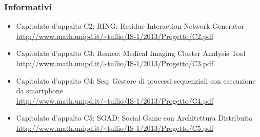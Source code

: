 	\subsubsection{Informativi}
	\begin{itemize}
		\item Capitolato d’appalto C2: RING: Residue Interaction Network Generator\\
			\url{http://www.math.unipd.it/~tullio/IS-1/2013/Progetto/C2.pdf}
		\item Capitolato d’appalto C3: Romeo: Medical Imaging Cluster Analysis Tool\\
			\url{http://www.math.unipd.it/~tullio/IS-1/2013/Progetto/C3.pdf}
		\item Capitolato d’appalto C4: Seq: Gestore di processi sequenziali con esecuzione da smartphone\\
			\url{http://www.math.unipd.it/~tullio/IS-1/2013/Progetto/C4.pdf}
		\item Capitolato d’appalto C5: SGAD: Social Game con Architettura Distribuita\\
			\url{http://www.math.unipd.it/~tullio/IS-1/2013/Progetto/C5.pdf}
	\end{itemize}